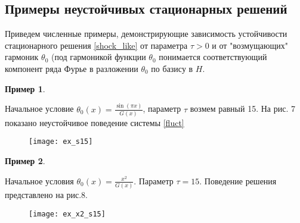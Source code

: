 \subsection{Примеры неустойчивых стационарных решений}

Приведем численные примеры, демонстрирующие зависимость устойчивости
стационарного решения \eqref{shock_like} от параметра $\tau > 0$ и от
"возмущающих" гармоник $\theta_0$ (под гармоникой функции $\theta_0$ понимается
соответствующий компонент ряда Фурье в разложении $\theta_0$ по базису в $H$.
\newtheorem{exmp_bur}{Пример}
\begin{exmp_bur}
\end{exmp_bur}

Начальное условие $\theta_0(x) = \frac{\sin(\pi x)}{G(x)}$, параметр $\tau$ 
возмем равный 15. На рис. 7 показано неустойчивое поведение системы
\eqref{fluct}

\begin{figure}[H]
    \centering
    \texttt{[image: ex\_s15]}
    \caption{}
\end{figure}

\begin{exmp_bur}
\end{exmp_bur}
Начальное условия $\theta_0(x) = \frac{x^2}{G(x)}$. Параметр $\tau = 15$.
Поведение решения представлено на рис.8.

\begin{figure}[H]
    \centering
    \texttt{[image: ex\_x2\_s15]}
    \caption{}
\end{figure}
